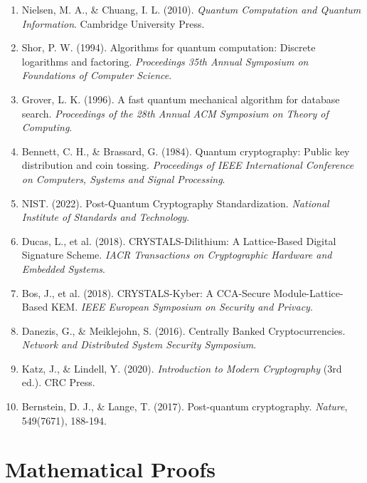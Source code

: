 \documentclass[11pt,a4paper]{article}
\begin{document}
\begin{enumerate}
    \item Nielsen, M. A., \& Chuang, I. L. (2010). \textit{Quantum Computation and Quantum Information}. Cambridge University Press.
    
    \item Shor, P. W. (1994). Algorithms for quantum computation: Discrete logarithms and factoring. \textit{Proceedings 35th Annual Symposium on Foundations of Computer Science}.
    
    \item Grover, L. K. (1996). A fast quantum mechanical algorithm for database search. \textit{Proceedings of the 28th Annual ACM Symposium on Theory of Computing}.
    
    \item Bennett, C. H., \& Brassard, G. (1984). Quantum cryptography: Public key distribution and coin tossing. \textit{Proceedings of IEEE International Conference on Computers, Systems and Signal Processing}.
    
    \item NIST. (2022). Post-Quantum Cryptography Standardization. \textit{National Institute of Standards and Technology}.
    
    \item Ducas, L., et al. (2018). CRYSTALS-Dilithium: A Lattice-Based Digital Signature Scheme. \textit{IACR Transactions on Cryptographic Hardware and Embedded Systems}.
    
    \item Bos, J., et al. (2018). CRYSTALS-Kyber: A CCA-Secure Module-Lattice-Based KEM. \textit{IEEE European Symposium on Security and Privacy}.
    
    \item Danezis, G., \& Meiklejohn, S. (2016). Centrally Banked Cryptocurrencies. \textit{Network and Distributed System Security Symposium}.
    
    \item Katz, J., \& Lindell, Y. (2020). \textit{Introduction to Modern Cryptography} (3rd ed.). CRC Press.
    
    \item Bernstein, D. J., \& Lange, T. (2017). Post-quantum cryptography. \textit{Nature}, 549(7671), 188-194.
\end{enumerate}

\appendix

\section{Mathematical Proofs}
\end{document}
